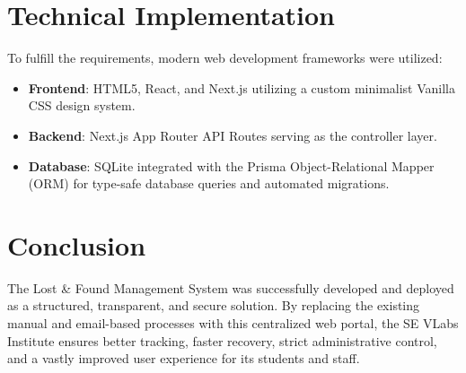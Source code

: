 \documentclass[12pt, a4paper]{article}
\begin{document}
\section{Technical Implementation}
To fulfill the requirements, modern web development frameworks were utilized:
\begin{itemize}
    \item \textbf{Frontend}: HTML5, React, and Next.js utilizing a custom minimalist Vanilla CSS design system.
    \item \textbf{Backend}: Next.js App Router API Routes serving as the controller layer.
    \item \textbf{Database}: SQLite integrated with the Prisma Object-Relational Mapper (ORM) for type-safe database queries and automated migrations.
\end{itemize}

\section{Conclusion}
The Lost \& Found Management System was successfully developed and deployed as a structured, transparent, and secure solution. By replacing the existing manual and email-based processes with this centralized web portal, the SE VLabs Institute ensures better tracking, faster recovery, strict administrative control, and a vastly improved user experience for its students and staff.
\end{document}
